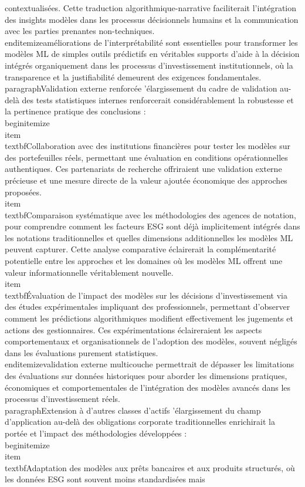 contextualisées. Cette traduction algorithmique-narrative faciliterait l'intégration des insights modèles dans les processus décisionnels humains et la communication avec les parties prenantes non-techniques.\n\\end{itemize}\n\nCes améliorations de l'interprétabilité sont essentielles pour transformer les modèles ML de simples outils prédictifs en véritables supports d'aide à la décision intégrés organiquement dans les processus d'investissement institutionnels, où la transparence et la justifiabilité demeurent des exigences fondamentales.\n\n\\paragraph{Validation externe renforcée} \n\nL'élargissement du cadre de validation au-delà des tests statistiques internes renforcerait considérablement la robustesse et la pertinence pratique des conclusions :\n\\begin{itemize}\n    \\item \\textbf{Collaboration avec des institutions financières} pour tester les modèles sur des portefeuilles réels, permettant une évaluation en conditions opérationnelles authentiques. Ces partenariats de recherche offriraient une validation externe précieuse et une mesure directe de la valeur ajoutée économique des approches proposées.\n    \n    \\item \\textbf{Comparaison systématique avec les méthodologies des agences de notation}, pour comprendre comment les facteurs ESG sont déjà implicitement intégrés dans les notations traditionnelles et quelles dimensions additionnelles les modèles ML peuvent capturer. Cette analyse comparative éclairerait la complémentarité potentielle entre les approches et les domaines où les modèles ML offrent une valeur informationnelle véritablement nouvelle.\n    \n    \\item \\textbf{Évaluation de l'impact des modèles sur les décisions d'investissement} via des études expérimentales impliquant des professionnels, permettant d'observer comment les prédictions algorithmiques modifient effectivement les jugements et actions des gestionnaires. Ces expérimentations éclaireraient les aspects comportementaux et organisationnels de l'adoption des modèles, souvent négligés dans les évaluations purement statistiques.\n\\end{itemize}\n\nCette validation externe multicouche permettrait de dépasser les limitations des évaluations sur données historiques pour aborder les dimensions pratiques, économiques et comportementales de l'intégration des modèles avancés dans les processus d'investissement réels.\n\n\\paragraph{Extension à d'autres classes d'actifs} \n\nL'élargissement du champ d'application au-delà des obligations corporate traditionnelles enrichirait la portée et l'impact des méthodologies développées :\n\\begin{itemize}\n    \\item \\textbf{Adaptation des modèles aux prêts bancaires et aux produits structurés}, où les données ESG sont souvent moins standardisées mais 